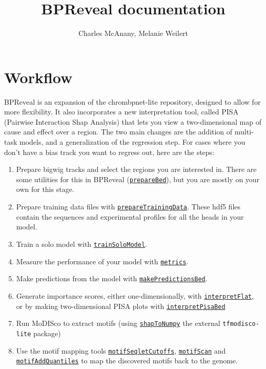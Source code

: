 \documentclass{article}
\title{BPReveal documentation}
\author{Charles McAnany, Melanie Weilert}
\begin{document}
\newcommand{\deprecation}[1]{\colorbox{orange}{#1}}
\newcommand{\progref}[1]{\hyperref[prog:#1]{\texttt{#1}}}
\maketitle

\tableofcontents

\newpage

\section{Workflow}

BPReveal is an expansion of the chrombpnet-lite repository, designed to allow
for more flexibility.
It also incorporates a new interpretation tool, called PISA (Pairwise
Interaction Shap Analysis) that lets you view a two-dimensional map of cause
and effect over a region.
The two main changes are the addition of multi-task models, and a
generalization of the regression step.
For cases where you don't have a bias track you want to regress out, here are
the steps:

\begin{enumerate}
    \item Prepare bigwig tracks and select the regions you are interested in.
        There are some utilities for this in BPReveal (\progref{prepareBed}),
        but you are mostly on your own for this stage.
    \item Prepare training data files with \progref{prepareTrainingData}.
        These hdf5 files contain the sequences and experimental profiles for
        all the heads in your model.
    \item Train a solo model with \progref{trainSoloModel}.
    \item Measure the performance of your model with \progref{metrics}.
    \item Make predictions from the model with \progref{makePredictionsBed}.
    \item Generate importance scores, either one-dimensionally, with
        \progref{interpretFlat}, or by making two-dimensional PISA plots with
        \progref{interpretPisaBed}
    \item Run MoDISco to extract motifs (using \progref{shapToNumpy} the
        external \texttt{tfmodisco-lite} package)
    \item Use the motif mapping tools \progref{motifSeqletCutoffs},
        \progref{motifScan} and \progref{motifAddQuantiles} to map the
        discovered motifs back to the genome.
\end{enumerate}
\end{document}
